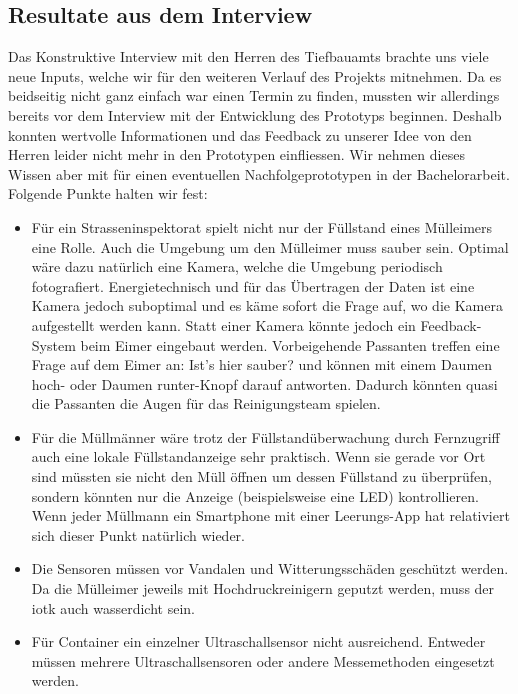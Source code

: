 \subsection{Resultate aus dem Interview}
Das Konstruktive Interview mit den Herren des Tiefbauamts brachte uns viele neue Inputs, welche wir für den weiteren Verlauf des Projekts mitnehmen.
Da es beidseitig nicht ganz einfach war einen Termin zu finden, mussten wir allerdings bereits vor dem Interview mit der Entwicklung des Prototyps beginnen. Deshalb konnten wertvolle Informationen und das Feedback zu unserer Idee von den Herren leider nicht mehr in den Prototypen einfliessen. Wir nehmen dieses Wissen aber mit für einen eventuellen Nachfolgeprototypen in der Bachelorarbeit. Folgende Punkte halten wir fest:
\begin{itemize}  
  \item Für ein Strasseninspektorat spielt nicht nur der Füllstand eines Mülleimers eine Rolle. Auch die Umgebung um den Mülleimer muss sauber sein. Optimal wäre dazu natürlich eine Kamera, welche die Umgebung periodisch fotografiert. Energietechnisch und für das Übertragen der Daten ist eine Kamera jedoch suboptimal und es käme sofort die Frage auf, wo die Kamera aufgestellt werden kann. Statt einer Kamera könnte jedoch ein Feedback-System beim Eimer eingebaut werden. Vorbeigehende Passanten treffen eine Frage auf dem Eimer an: \glqq{}Ist's hier sauber?\grqq{} und können mit einem \glqq{}Daumen hoch\grqq{}- oder \glqq{}Daumen runter\grqq{}-Knopf darauf antworten. Dadurch könnten quasi die Passanten die Augen für das Reinigungsteam spielen.
  \item Für die Müllmänner wäre trotz der Füllstandüberwachung durch Fernzugriff auch eine lokale Füllstandanzeige sehr praktisch. Wenn sie gerade vor Ort sind müssten sie nicht den Müll öffnen um dessen Füllstand zu überprüfen, sondern könnten nur die Anzeige (beispielsweise eine LED) kontrollieren. Wenn jeder Müllmann ein Smartphone mit einer Leerungs-App hat relativiert sich dieser Punkt natürlich wieder.
  \item Die Sensoren müssen vor Vandalen und Witterungsschäden geschützt werden. Da die Mülleimer jeweils mit Hochdruckreinigern geputzt werden, muss der \gls{iotk} auch wasserdicht sein.
  \item Für Container ein einzelner Ultraschallsensor nicht ausreichend. Entweder müssen mehrere  Ultraschallsensoren oder andere Messemethoden eingesetzt werden.
\end{itemize}
